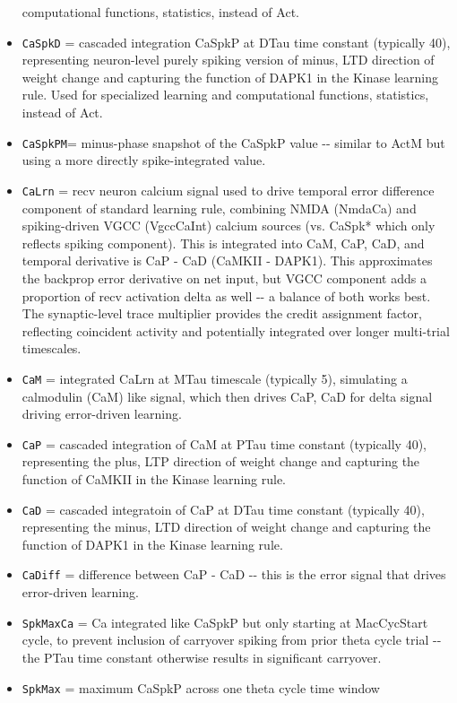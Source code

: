 \documentclass[11pt,twoside]{article}
\newif\myifpdf
\begin{document}
\begin{itemize}
  computational functions, statistics, instead of Act.
\item
  \texttt{CaSpkD} = cascaded integration CaSpkP at DTau time constant
  (typically 40), representing neuron-level purely spiking version of
  minus, LTD direction of weight change and capturing the function of
  DAPK1 in the Kinase learning rule. Used for specialized learning and
  computational functions, statistics, instead of Act.
\item
  \texttt{CaSpkPM}= minus-phase snapshot of the CaSpkP value -\/-
  similar to ActM but using a more directly spike-integrated value.
\item
  \texttt{CaLrn} = recv neuron calcium signal used to drive temporal
  error difference component of standard learning rule, combining NMDA
  (NmdaCa) and spiking-driven VGCC (VgccCaInt) calcium sources (vs.
  CaSpk* which only reflects spiking component). This is integrated into
  CaM, CaP, CaD, and temporal derivative is CaP - CaD (CaMKII - DAPK1).
  This approximates the backprop error derivative on net input, but VGCC
  component adds a proportion of recv activation delta as well -\/- a
  balance of both works best. The synaptic-level trace multiplier
  provides the credit assignment factor, reflecting coincident activity
  and potentially integrated over longer multi-trial timescales.
\item
  \texttt{CaM} = integrated CaLrn at MTau timescale (typically 5),
  simulating a calmodulin (CaM) like signal, which then drives CaP, CaD
  for delta signal driving error-driven learning.
\item
  \texttt{CaP} = cascaded integration of CaM at PTau time constant
  (typically 40), representing the plus, LTP direction of weight change
  and capturing the function of CaMKII in the Kinase learning rule.
\item
  \texttt{CaD} = cascaded integratoin of CaP at DTau time constant
  (typically 40), representing the minus, LTD direction of weight change
  and capturing the function of DAPK1 in the Kinase learning rule.
\item
  \texttt{CaDiff} = difference between CaP - CaD -\/- this is the error
  signal that drives error-driven learning.
\item
  \texttt{SpkMaxCa} = Ca integrated like CaSpkP but only starting at
  MacCycStart cycle, to prevent inclusion of carryover spiking from
  prior theta cycle trial -\/- the PTau time constant otherwise results
  in significant carryover.
\item
  \texttt{SpkMax} = maximum CaSpkP across one theta cycle time window

\end{itemize}
\end{document}
